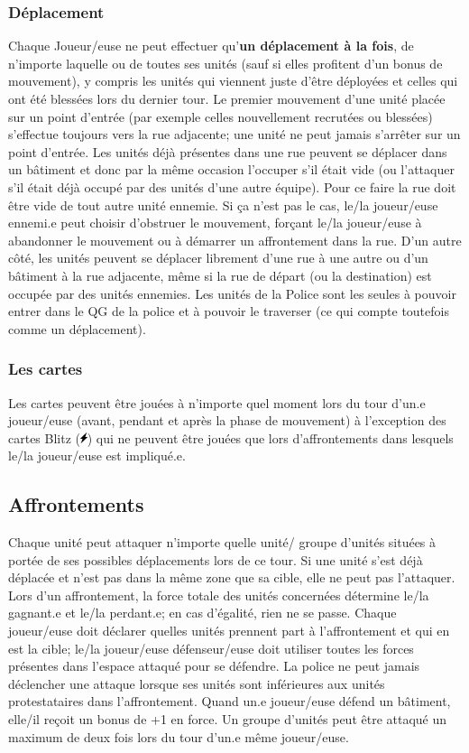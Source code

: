 \documentclass[a4paper,13pt]{scrartcl}
\begin{document}
\subsubsection*{Déplacement}
Chaque Joueur/euse ne peut effectuer qu'\textbf{un déplacement à la fois}, de n'importe laquelle ou de toutes ses unités (sauf si elles profitent d'un bonus de mouvement), y compris les unités qui viennent juste d'être déployées et celles qui ont été blessées lors du dernier tour. Le premier mouvement d'une unité placée sur un point d'entrée (par exemple celles nouvellement recrutées ou blessées) s'effectue toujours vers la rue adjacente; une unité ne peut jamais s'arrêter sur un point d'entrée.
Les unités déjà présentes dans une rue peuvent se déplacer dans un bâtiment et donc par la même occasion l'occuper s'il était vide (ou l'attaquer s'il était déjà occupé par des unités d'une autre équipe). Pour ce faire la rue doit être vide de tout autre unité ennemie. Si ça n'est pas le cas, le/la joueur/euse ennemi.e peut choisir d'obstruer le mouvement, forçant le/la joueur/euse à abandonner le mouvement ou à démarrer un affrontement dans la rue. D'un autre côté, les unités peuvent se déplacer librement d'une rue à une autre ou d'un bâtiment à la rue adjacente, même si la rue de départ (ou la destination) est occupée par des unités ennemies. Les unités de la Police sont les seules à pouvoir entrer dans le QG de la police et à pouvoir le traverser (ce qui compte toutefois comme un déplacement).

\subsubsection*{Les cartes}
Les cartes peuvent être jouées à n'importe quel moment lors du tour d'un.e joueur/euse (avant, pendant et après la phase de mouvement) à l'exception des cartes Blitz (\includegraphics[height=9pt]{blitz.png}) qui ne peuvent être jouées que lors d'affrontements dans lesquels le/la joueur/euse est impliqué.e.

\subsection{Affrontements}
Chaque unité peut attaquer n'importe quelle unité/ groupe d'unités situées à portée de ses possibles déplacements lors de ce tour.
Si une unité s'est déjà déplacée et n'est pas dans la même zone que sa cible, elle ne peut pas l'attaquer. Lors d'un affrontement, la force totale des unités concernées détermine le/la gagnant.e et le/la perdant.e; en cas d'égalité, rien ne se passe.
Chaque joueur/euse doit déclarer quelles unités prennent part à l'affrontement et qui en est la cible; le/la joueur/euse défenseur/euse doit utiliser toutes les forces présentes dans l'espace attaqué pour se défendre.
La police ne peut jamais déclencher une attaque lorsque ses unités sont inférieures aux unités protestataires dans l'affrontement.
Quand un.e joueur/euse défend un bâtiment, elle/il reçoit un bonus de +1 en force. Un groupe d'unités peut être attaqué un maximum de deux fois lors du tour d'un.e même joueur/euse.
\end{document}
